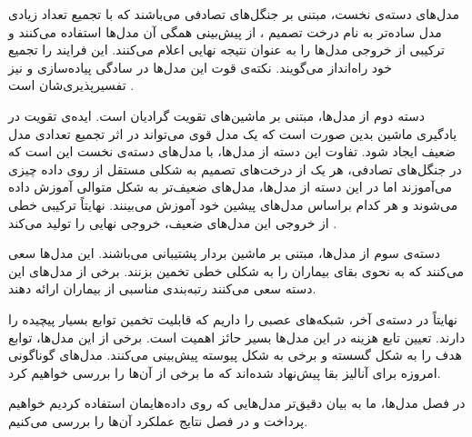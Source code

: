 مدل‌های دسته‌ی نخست، مبتنی بر جنگل‌های تصادفی  می‌باشند که با تجمیع تعداد زیادی مدل ساده‌تر به نام درخت تصمیم ، از پیش‌بینی همگی آن مدل‌ها استفاده می‌کنند و ترکیبی از خروجی مدل‌ها را به عنوان نتیجه نهایی اعلام می‌کنند. این فرایند را تجمیع خود راه‌انداز می‌گویند. نکته‌ی قوت این مدل‌ها در سادگی پیاده‌سازی و نیز تفسیرپذیری‌شان است . 

دسته دوم از مدل‌ها، مبتنی بر ماشین‌های تقویت گرادیان است. ایده‌ی تقویت در یادگیری ماشین بدین صورت است که یک مدل قوی می‌تواند در اثر تجمیع تعدادی مدل ضعیف  ایجاد شود. تفاوت این دسته از مدل‌ها، با مدل‌های دسته‌ی نخست این است که در جنگل‌های تصادفی، هر یک از درخت‌های تصمیم به شکلی مستقل از روی داده چیزی می‌آموزند اما در این دسته از مدل‌ها، مدل‌های ضعیف‌‌تر به شکل متوالی آموزش داده می‌شوند و هر کدام براساس مدل‌های پیشین خود آموزش می‌بینند.  نهایتاً ترکیبی خطی از خروجی این مدل‌های ضعیف، خروجی نهایی را تولید می‌کند . 

دسته‌ی سوم از مدل‌ها، مبتنی بر ماشین بردار پشتیبانی  می‌باشند. این مدل‌ها سعی می‌کنند که به نحوی بقای بیماران را به شکلی خطی تخمین بزنند. برخی از مدل‌های این دسته سعی می‌کنند رتبه‌بندی مناسبی از بیماران ارائه دهند.

نهایتاً در دسته‌ی آخر، شبکه‌های عصبی را داریم که قابلیت تخمین توابع بسیار پیچیده را دارند. تعیین تابع هزینه  در این مدل‌ها بسیر حائز اهمیت است. برخی از این مدل‌ها، توابع هدف را به شکل گسسته و برخی به شکل پیوسته پیش‌بینی می‌کنند. مدل‌های گوناگونی امروزه برای آنالیز بقا پیش‌نهاد شده‌اند  که ما برخی از آن‌ها را بررسی خواهیم کرد.

در فصل مدل‌ها، ما به بیان دقیق‌تر مدل‌هایی که روی داده‌هایمان استفاده کردیم خواهیم پرداخت و در فصل نتایج عملکرد آن‌ها را بررسی می‌کنیم.



